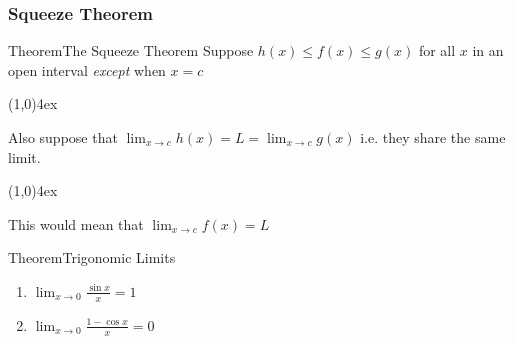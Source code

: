 \documentclass{MathNotes}
\newenvironment{theorem}[1]{\begin{GrayBox}{Theorem}{#1}}{\end{GrayBox}}
\newcommand{\br}{
\begin{center}
\line(1,0){4ex}
\end{center}}
\begin{document}
\newpage
\subsubsection{Squeeze Theorem}\label{sec:1.2.2}

\begin{multicols}{2}[]
    \begin{theorem}{The Squeeze Theorem}
        Suppose $h(x)\leq f(x) \leq g(x)$ for all $x$ in an open interval
        \textit{except} when $x=c$
        \br

        Also suppose that $\displaystyle\lim_{x\to c}h(x)=L=\lim_{x\to c}g(x)$ i.e. they share
        the same limit.
        \br

        This would mean that $\lim_{x\to c}f(x)=L$
    \end{theorem}

    \begin{theorem}{Trigonomic Limits}
        \begin{enumerate}
            \item $\displaystyle\lim_{x\to 0}\frac{\sin x}{x} = 1$
            \item $\displaystyle\lim_{x\to 0}\frac{1 - \cos x}{x} = 0$
        \end{enumerate}
    \end{theorem}

    \begin{center}
\end{center}
\end{multicols}
\end{document}
